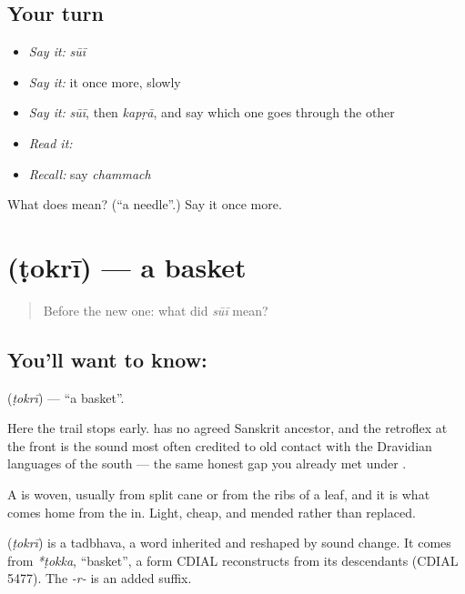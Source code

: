 \subsection*{Your turn}
\begin{itemize}
\raggedright
  \item \emph{Say it:} \emph{sūī}
  \item \emph{Say it:} it once more, slowly
  \item \emph{Say it:} \emph{sūī}, then \emph{kapṛā}, and say which one goes through the other
  \item \emph{Read it:} \textbf{}
  \item \emph{Recall:} say \emph{chammach}
\end{itemize}

\begin{tcolorbox}[breakable,colback=teal!4,colframe=teal!35!black,title={Before you move on}]
What does  mean? (\textquotedblleft{}a needle\textquotedblright{}.) Say it once more.
\end{tcolorbox}
\section[\texorpdfstring{\hi{टोकरी} (ṭokrī)}{टोकरी (ṭokrī)}]{ (ṭokrī) — a basket}

\label{lesson:HI-C62-basket}



\begin{quote}
Before the new one: what did \emph{sūī} mean?
\end{quote}

\subsection*{You'll want to know: }
\textbf{} (\emph{ṭokrī}) — \textquotedblleft{}a basket\textquotedblright{}.

Here the trail stops early.  has no agreed Sanskrit ancestor, and the retroflex  at the front is the sound most often credited to old contact with the Dravidian languages of the south — the same honest gap you already met under .

A  is woven, usually from split cane or from the ribs of a leaf, and it is what  comes home from the  in. Light, cheap, and mended rather than replaced.

\begin{cousinweb}
\textbf{} (\emph{ṭokrī}) is a tadbhava, a word inherited and reshaped by sound change. It comes from \emph{*ṭokka}, \textquotedblleft{}basket\textquotedblright{}, a form CDIAL reconstructs from its descendants (CDIAL 5477). The \emph{-r-} is an added suffix.
\end{cousinweb}


